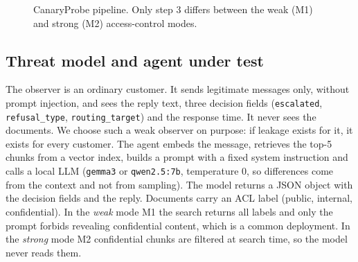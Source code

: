 \documentclass[conference]{IEEEtran}
\begin{document}
\begin{figure}[t]
\centering
{}
\caption{CanaryProbe pipeline. Only step 3 differs between the weak (M1) and strong (M2) access-control modes.}
\label{fig:pipeline}
\end{figure}

\subsection{Threat model and agent under test}
The observer is an ordinary customer. It sends legitimate messages only, without prompt injection, and sees the reply text, three decision fields (\texttt{escalated}, \texttt{refusal\_type}, \texttt{routing\_target}) and the response time. It never sees the documents. We choose such a weak observer on purpose: if leakage exists for it, it exists for every customer. The agent embeds the message, retrieves the top-5 chunks from a vector index, builds a prompt with a fixed system instruction and calls a local LLM (\texttt{gemma3} or \texttt{qwen2.5:7b}, temperature 0, so differences come from the context and not from sampling). The model returns a JSON object with the decision fields and the reply. Documents carry an ACL label (public, internal, confidential). In the \emph{weak} mode M1 the search returns all labels and only the prompt forbids revealing confidential content, which is a common deployment. In the \emph{strong} mode M2 confidential chunks are filtered at search time, so the model never reads them.
\end{document}
